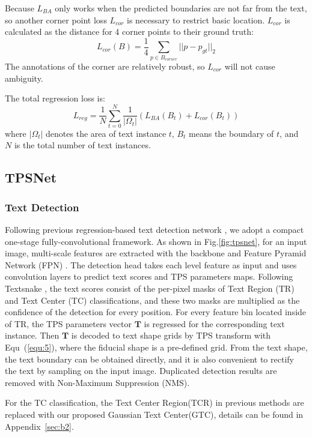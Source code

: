 \documentclass[sigconf]{acmart}
\begin{document}
	Because $L_{BA}$ only works when the predicted boundaries are not far from the text, so another corner point loss $L_{cor}$ is necessary to restrict basic location. $L_{cor}$ is calculated as the distance for 4 corner points to their ground truth:
	\begin{equation}
	L_{cor}(B) = \frac{1}{4}\sum_{p\in B_{corner}}||p-p_{gt}||_2
	\end{equation}
	The annotations of the corner are relatively robust, so $L_{cor}$ will not cause ambiguity.
	
	The total regression loss is:
	\begin{equation}
	L_{reg} = \frac{1}{N}\sum_{t=0}^N \frac{1}{|\Omega_t|}(L_{BA}(B_t) + L_{cor}(B_t))
	\end{equation}
	where $|\Omega_t|$ denotes the area of text instance $t$, $B_t$ means the boundary of $t$, and $N$ is the total number of text instances.
	
	
	\subsection{TPSNet}
	\subsubsection{Text Detection}  
	Following previous regression-based text detection network    \cite{zhou2017east, Wang2020textray, zhu2021fourier}, we adopt a compact one-stage fully-convolutional framework. As shown in Fig.\ref{fig:tpsnet}, for an input image, multi-scale features are extracted with the backbone and Feature Pyramid Network (FPN) \cite{lin2017FPN}. The detection head takes each level feature as input and uses convolution layers to predict text scores and TPS parameters maps. Following Textsnake \cite{long2018textsnake}, the text scores consist of the per-pixel masks of Text Region (TR) and Text Center (TC) classifications, and these two masks are multiplied as the confidence of the detection for every position. For every feature bin located inside of TR, the TPS parameters vector $\mathbf{T}$ is regressed for the corresponding text instance. Then $\mathbf{T}$ is decoded to text shape grids by TPS transform with Equ~(\ref{equ:5}), where the fiducial shape is a pre-defined grid. From the text shape, the text boundary can be obtained directly, and it is also convenient to rectify the text by sampling on the input image. Duplicated detection results are removed with Non-Maximum Suppression (NMS).
	
	For the TC classification, the Text Center Region(TCR) in previous methods are replaced with our proposed Gaussian Text Center(GTC), details can be found in Appendix~\ref{sec:b2}.
	
\end{document}
